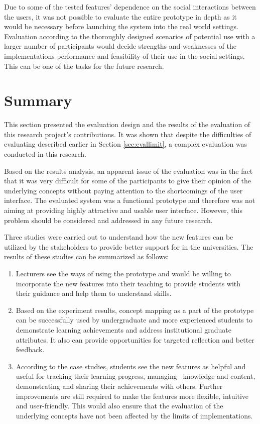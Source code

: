 Due to some of the tested features' dependence on the social interactions
between the users, it was not possible to evaluate the entire prototype in depth
as it would be necessary before launching the system into the real world
settings. Evaluation according to the thoroughly designed scenarios of potential
use with a larger number of participants would decide strengths and weaknesses
of the implementations performance and feasibility of their use in the social
settings. This can be one of the tasks for the future research.

\section{Summary}

This section presented the evaluation design and the results of the evaluation
of this research project's contributions. It was shown that despite the
difficulties of evaluating \LLLs described earlier in Section
\ref{sec:evallimit}, a complex evaluation was conducted in this research.

Based on the results analysis, an apparent issue of the evaluation was in the
fact that it was very difficult for some of the participants to give their
opinion of the underlying concepts without paying attention to the shortcomings
of the user interface. The evaluated system was a functional prototype and
therefore was not aiming at providing highly attractive and usable user
interface. However, this problem should be considered and addressed in any
future research.

Three studies were carried out to understand how the new features can be
utilized by the stakeholders to provide better support for \LLLs in the
universities. The results of these studies can be summarized as follows:

\begin{enumerate}
  \item Lecturers see the ways of using the prototype and would be willing
  to incorporate the new features into their teaching to provide students with
  their guidance and help them to understand \LLLs skills.
  \item Based on the experiment results, concept mapping as a part of the
  prototype can be successfully used by undergraduate and more experienced
  students to demonstrate learning achievements and address institutional
  graduate attributes. It also can provide opportunities for targeted reflection
  and better feedback.
  \item According to the case studies, students see the new features as
  helpful and useful for tracking their learning progress, managing
  \ep~knowledge and content, demonstrating and sharing their achievements with
  others. Further improvements are still required to make the features more
  flexible, intuitive and user-friendly. This would also ensure that the
  evaluation of the underlying concepts have not been affected by the limits of
  implementations.
\end{enumerate} 
